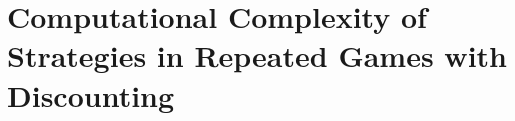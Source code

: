 \chapter{Computational Complexity of Strategies in Repeated Games with Discounting}\label{ch:ch3}


%
%
